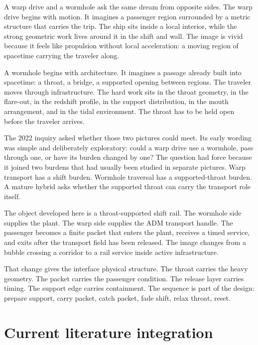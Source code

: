 \documentclass[11pt]{article}
\begin{document}
A warp drive and a wormhole ask the same dream from opposite sides. The warp drive begins with motion. It imagines a passenger region surrounded by a metric structure that carries the trip. The ship sits inside a local interior, while the strong geometric work lives around it in the shift and wall. The image is vivid because it feels like propulsion without local acceleration: a moving region of spacetime carrying the traveler along.

A wormhole begins with architecture. It imagines a passage already built into spacetime: a throat, a bridge, a supported opening between regions. The traveler moves through infrastructure. The hard work sits in the throat geometry, in the flare-out, in the redshift profile, in the support distribution, in the mouth arrangement, and in the tidal environment. The throat has to be held open before the traveler arrives.

The 2022 inquiry \citep{goldman_2022_inquiry} asked whether those two pictures could meet. Its early wording was simple and deliberately exploratory: could a warp drive use a wormhole, pass through one, or have its burden changed by one? The question had force because it joined two burdens that had usually been studied in separate pictures. Warp transport has a shift burden. Wormhole traversal has a supported-throat burden. A mature hybrid asks whether the supported throat can carry the transport role itself.

The object developed here is a throat-supported shift rail. The wormhole side supplies the plant. The warp side supplies the ADM transport handle. The passenger becomes a finite packet that enters the plant, receives a timed service, and exits after the transport field has been released. The image changes from a bubble crossing a corridor to a rail service inside active infrastructure.

That change gives the interface physical structure. The throat carries the heavy geometry. The packet carries the passenger condition. The release layer carries timing. The support edge carries containment. The sequence is part of the design: prepare support, carry packet, catch packet, fade shift, relax throat, reset.


\section{Current literature integration}
\end{document}
